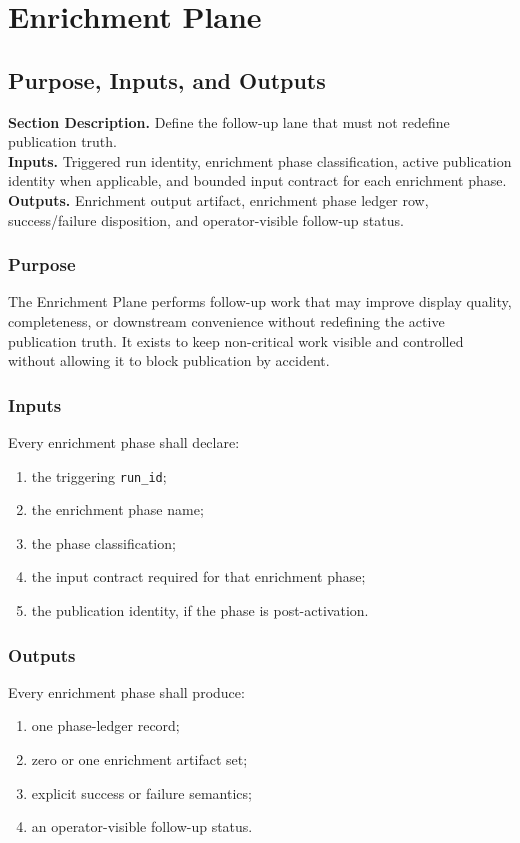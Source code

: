 \documentclass[11pt]{report}
\newcommand{\meta}[3]{\textbf{Section Description.} #1\\
\textbf{Inputs.} #2\\
\textbf{Outputs.} #3\par}
\begin{document}
\chapter{Enrichment Plane}
\section{Purpose, Inputs, and Outputs}
\meta{Define the follow-up lane that must not redefine publication truth.}{Triggered run identity, enrichment phase classification, active publication identity when applicable, and bounded input contract for each enrichment phase.}{Enrichment output artifact, enrichment phase ledger row, success/failure disposition, and operator-visible follow-up status.}

\subsection{Purpose}
The Enrichment Plane performs follow-up work that may improve display quality, completeness, or downstream convenience without redefining the active publication truth. It exists to keep non-critical work visible and controlled without allowing it to block publication by accident.

\subsection{Inputs}
Every enrichment phase shall declare:
\begin{enumerate}[leftmargin=1.2cm]
    \item the triggering \texttt{run\_id};
    \item the enrichment phase name;
    \item the phase classification;
    \item the input contract required for that enrichment phase;
    \item the publication identity, if the phase is post-activation.
\end{enumerate}

\subsection{Outputs}
Every enrichment phase shall produce:
\begin{enumerate}[leftmargin=1.2cm]
    \item one phase-ledger record;
    \item zero or one enrichment artifact set;
    \item explicit success or failure semantics;
    \item an operator-visible follow-up status.
\end{enumerate}
\end{document}

